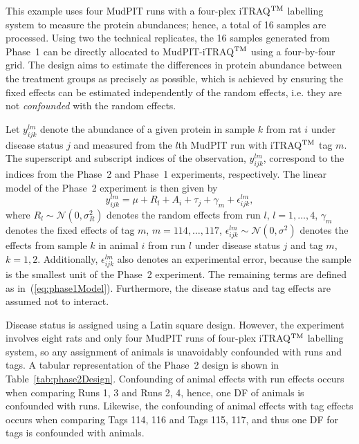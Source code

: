 \documentclass[article]{jss}
\begin{document}
This example uses four MudPIT runs with a four-plex iTRAQ$^{\rm TM}$ labelling system to measure the protein abundances; hence, a total of 16 samples are processed. Using two the technical replicates, the 16 samples generated from Phase~1 can be directly allocated to MudPIT-iTRAQ$^{\rm TM}$ using a four-by-four grid. The design aims to estimate the differences in protein abundance between the treatment groups as precisely as possible, which is achieved by ensuring the fixed effects can be estimated independently of the random effects, i.e. they are not \emph{confounded} with the random effects.

Let $y_{ijk}^{lm}$ denote the abundance of a given protein in sample $k$ from rat $i$ under disease status $j$ and measured from the $l$th MudPIT run with iTRAQ$^{\rm TM}$ tag $m$. The superscript and subscript indices of the observation, $y_{ijk}^{lm}$, correspond to the indices from the Phase~2 and Phase~1 experiments, respectively. The linear model of the Phase~2 experiment is then given by
\begin{equation}\label{eq:phase2Model}
y_{ijk}^{lm}= \mu + R_{l} + A_{i}+ \tau_{j} + \gamma_{m} + \epsilon_{ijk}^{lm},
\end{equation}
where $R_{l} \sim \mathcal{N}(0, \sigma_{R}^2)$ denotes the random effects from run $l$,  $l=1,\dots, 4$, $\gamma_{m}$ denotes the fixed effects of tag $m$, $m = 114,\dots, 117$, $\epsilon_{ijk}^{lm} \sim \mathcal{N}(0, \sigma^2)$ denotes the effects from sample $k$ in animal $i$ from run $l$ under disease status $j$ and tag $m$, $k = 1, 2$. Additionally, $\epsilon_{ijk}^{lm}$ also denotes an experimental error, because the sample is the smallest unit of the Phase~2 experiment. The remaining terms are defined as in~(\ref{eq:phase1Model}). Furthermore, the disease status and tag effects are assumed not to interact. 

Disease status is assigned using a Latin square design. However, the experiment involves eight rats and only four MudPIT runs of four-plex iTRAQ$^{\rm TM}$ labelling system, so any assignment of animals is unavoidably confounded with runs and tags. A tabular representation of the Phase~2 design is shown in Table~\ref{tab:phase2Design}. Confounding of animal effects with run effects occurs when comparing Runs 1, 3 and Runs 2, 4, hence, one DF of animals is confounded with runs. Likewise, the confounding of animal effects with tag effects occurs when comparing Tags 114, 116 and Tags 115, 117, and thus one DF for tags is confounded with animals.
\end{document}
